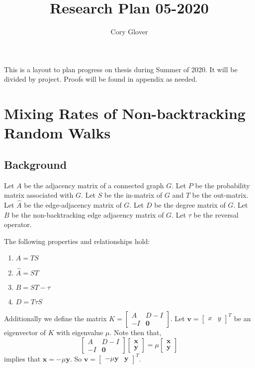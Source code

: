 \documentclass[11pt]{article}
\title{Research Plan 05-2020}
\author{Cory Glover}
\begin{document}
\maketitle

This is a layout to plan progress on thesis during Summer of 2020.
It will be divided by project.
Proofs will be found in appendix as needed.

\section{Mixing Rates of Non-backtracking Random Walks}

\subsection{Background}

Let $A$ be the adjacency matrix of a connected graph $G$.
Let $P$ be the probability matrix associated with $G$.
Let $S$ be the in-matrix of $G$ and $T$ be the out-matrix.
Let $\hat{A}$ be the edge-adjacency matrix of $G$.
Let $D$ be the degree matrix of $G$.
Let $B$ be the non-backtracking edge adjacency matrix of $G$.
Let $\tau$ be the reversal operator.

The following properties and relationships hold:
\begin{enumerate}
    \item $A=TS$\\
    \item $\hat{A}=ST$\\
    \item $B=ST-\tau$\\
    \item $D=T\tau S$
\end{enumerate}

Additionally we define the matrix $K=\begin{bmatrix}A&D-I\\-I&\mathbf{0}\end{bmatrix}.$
Let $\mathbf{v}=\begin{bmatrix}x&y\end{bmatrix}^T$ be an eigenvector of $K$ with eigenvalue $\mu$.
Note then that,
\[\begin{bmatrix}A&D-I\\-I&\mathbf{0}\end{bmatrix}\begin{bmatrix}\mathbf{x}\\\mathbf{y}\end{bmatrix}=\mu\begin{bmatrix}\mathbf{x}\\\mathbf{y}\end{bmatrix}\]
implies that $\mathbf{x}=-\mu \mathbf{y}$.
So $\mathbf{v}=\begin{bmatrix}-\mu \mathbf{y}&\mathbf{y}\end{bmatrix}^T$.
\end{document}

